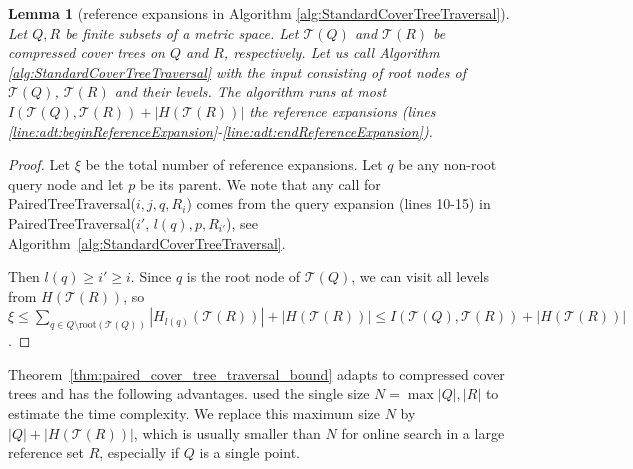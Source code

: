 \documentclass[a4paper,UKenglish,cleveref, autoref]{lipics-v2019}
\numberwithin{algocf}{section}
\theoremstyle{definition}
\theoremstyle{definition}
\theoremstyle{definition}
\theoremstyle{plain}
\newtheorem{lem}[algocf]{Lemma}
\newcommand{\T}{\mathcal{T}}
\begin{document}
\begin{lem}[reference expansions in Algorithm \ref{alg:StandardCoverTreeTraversal}]
\label{lem:NumberOfReferenceExpansions}
Let $Q,R$ be finite subsets of a metric space. 
Let $\T(Q)$ and $\T(R)$ be compressed cover trees on $Q$ and $R$, respectively. 
Let us call Algorithm \ref{alg:StandardCoverTreeTraversal} with the input consisting of root nodes of $\T(Q)$, $\T(R)$ and their levels.
The algorithm runs at most $I(\T(Q), \T(R)) + |H(\T(R))|$ the reference expansions (lines \ref{line:adt:beginReferenceExpansion}-\ref{line:adt:endReferenceExpansion}).
\end{lem}
\begin{proof}
Let $\xi$ be the total number of reference expansions. 
Let $q$ be any non-root query node and let $p$ be its parent. 
We note that any call for PairedTreeTraversal($i, j, q, R_{i}$) comes  from the query expansion (lines 10-15) in PairedTreeTraversal($i'$, $l(q), p , R_{i'}$), see Algorithm~\ref{alg:StandardCoverTreeTraversal}.
\medskip

Then $l(q) \geq i' \geq i$. 
Since $q$ is the root node of $\T(Q)$, we can visit all levels from $H(\T(R))$, so
$\xi \leq \sum\limits_{q \in Q \setminus \text{root}(\T(Q))} |H_{l(q)}(\T(R))| + |H(\T(R))| \leq I(\T(Q), \T(R)) + |H(\T(R))|$.
\end{proof}

Theorem~\ref{thm:paired_cover_tree_traversal_bound} adapts \cite[Theorem~1]{curtin2015plug} to compressed cover trees and has the following advantages. 
\cite[Theorem~1]{curtin2015plug} 
used the single size $N = \max{|Q|, |R|}$ to estimate the time complexity. 
We replace this maximum size $N$ by $|Q| + |H(\T(R))|$, which is usually smaller than $N$ for online search in a large reference set $R$, especially if $Q$ is a single point. 
\end{document}

